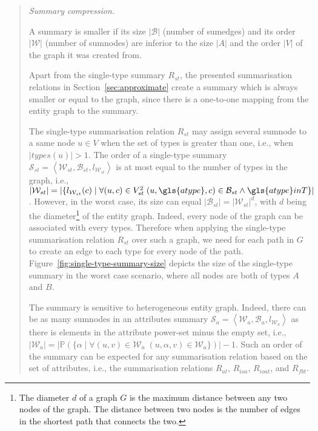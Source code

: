 \begin{quotation}
	\item[\emph{Summary compression.}]

	A summary is smaller if its size $\vert \mathcal{B} \vert$ (number of sumedges) and its order $\vert \mathcal{W} \vert$ (number of sumnodes) are inferior to the size $\vert A \vert$ and the order $\vert V \vert$ of the graph it was created from.

	Apart from the single-type summary $R_{st}$, the presented summarisation relations in Section~\ref{sec:approximate} create a summary which is always smaller or equal to the graph, since there is a one-to-one mapping from the entity graph to the summary.

	The single-type summarisation relation $R_{st}$ may assign several sumnode to a same node $u \in V$ when the set of types is greater than one, i.e., when $\vert types(u) \vert > 1$. The order of a single-type summary $\mathcal{S}_{st} = \left\langle \mathcal{W}_{st}, \mathcal{B}_{st}, l_{\mathcal{W}_{st}} \right\rangle$ is at most equal to the number of types in the graph, i.e., $\vert \mathcal{W}_{st} \vert = \vert \{ l_{\mathcal{W}_{st}}(c) \mid \forall (u, c) \in V^2_{st}\; (u, \gls{atype}, c) \in \mathcal{B}_{st} \wedge \gls{atype} in T \} \vert$. However, in the worst case, its size can equal $\vert \mathcal{B}_{st} \vert = \vert \mathcal{W}_{st} \vert ^d$, with $d$ being the diameter\footnote{The diameter $d$ of a graph $G$ is the maximum distance between any two nodes of the graph. The distance between two nodes is the number of edges in the shortest path that connects the two.} of the entity graph. Indeed, every node of the graph can be associated with every types. Therefore when applying the single-type summarisation relation $R_{st}$ over such a graph, we need for each path in $G$ to create an edge to each type for every node of the path. Figure~\ref{fig:single-type-summary-size} depicts the size of the single-type summary in the worst case scenario, where all nodes are both of types $A$ and $B$.

	The summary is sensitive to heterogeneous entity graph. Indeed, there can be as many sumnodes in an attributes summary $\mathcal{S}_a = \left\langle \mathcal{W}_{a}, \mathcal{B}_{a}, l_{\mathcal{W}_{a}} \right\rangle$ as there is elements in the attribute power-set minus the empty set, i.e., $\vert \mathcal{W}_a \vert = \vert \mathbb{P} \left( \{ \alpha \mid \forall (u, v) \in \mathcal{W}_a\; (u, \alpha, v) \in \mathcal{W}_a \} \right) \vert - 1$. Such an order of the summary can be expected for any summarisation relation based on the set of attributes, i.e., the summarisation relations $R_{at}$, $R_{ioa}$, $R_{ioat}$, and $R_{fbt}$.\\


\end{quotation}
